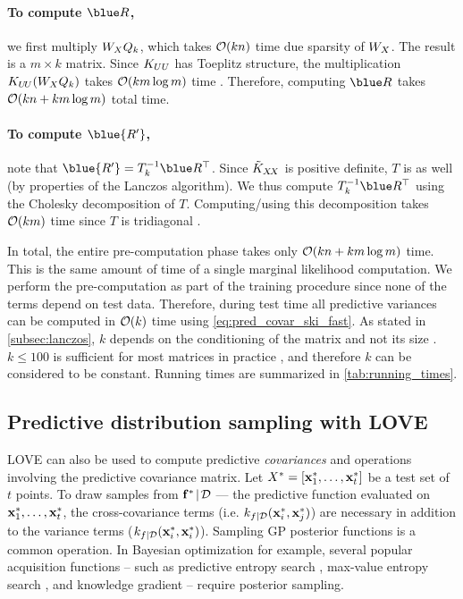 \paragraph{To compute $\blue R$,} we first multiply $W_{X}Q_{k}$, which takes $\bigo{kn}$ time due sparsity of $W_{X}$.
The result is a $m \times k$ matrix.
Since $K_{UU}$ has Toeplitz structure, the multiplication $K_{U\!U} (W_{X}Q_{k})$ takes $\bigo{km \log m}$ time \cite{saatcci2012scalable}.
Therefore, computing $\blue R$ takes $\bigo{kn + km\log m}$ total time.

\paragraph{To compute $\blue {R'}$,} note that $\blue{R'} = T^{-1}_{k}\blue R^{\top}$.
Since $\tilde {K}_{X\!X}$ is positive definite, $T$ is as well (by properties of the Lanczos algorithm).
We thus compute $T^{-1}_k \blue R^\top$ using the Cholesky decomposition of $T$.
Computing/using this decomposition takes $\bigo{km}$ time since $T$ is tridiagonal \cite{loan1999introduction}.

In total, the entire pre-computation phase takes only $\bigo{kn + km \log m}$ time.
This is the same amount of time of a single marginal likelihood computation.
We perform the pre-computation as part of the training procedure since none of the terms depend on test data.
Therefore, during test time all predictive variances can be computed in $\bigo{k}$ time using \eqref{eq:pred_covar_ski_fast}.
As stated in \autoref{subsec:lanczos}, $k$ depends on the conditioning of the matrix and not its size \cite{golub2012matrix}.
$k\leq100$ is sufficient for most matrices in practice \cite{golub2012matrix}, and therefore $k$ can be considered to be constant.
Running times are summarized in \autoref{tab:running_times}.

\subsection{Predictive distribution sampling with LOVE{}}
\label{sec:sampling_method}

LOVE{} can also be used to compute predictive \emph{covariances} and operations involving the predictive covariance matrix.
Let $X^* = [\mathbf{x}^*_1, \ldots, \mathbf{x}^*_t]$ be a test set of $t$ points.
To draw samples from $\mathbf{f}^* \! \mid \! \mathcal D$ --- the predictive function evaluated on $\mathbf{x}^*_1, \ldots, \mathbf{x}^*_t$, the cross-covariance terms (i.e. $k_{f \mid \mathcal D} (\mathbf{x}^*_i, \mathbf{x}^*_j)$) are necessary in addition to the variance terms ($k_{f \mid \mathcal D} (\mathbf{x}^*_i, \mathbf{x}^*_i)$).
Sampling GP posterior functions is a common operation.
In Bayesian optimization for example, several popular acquisition functions -- such as predictive entropy search \cite{hernandez2014predictive}, max-value entropy search \cite{wang2017max}, and knowledge gradient \cite{frazier2009knowledge} -- require posterior sampling.


